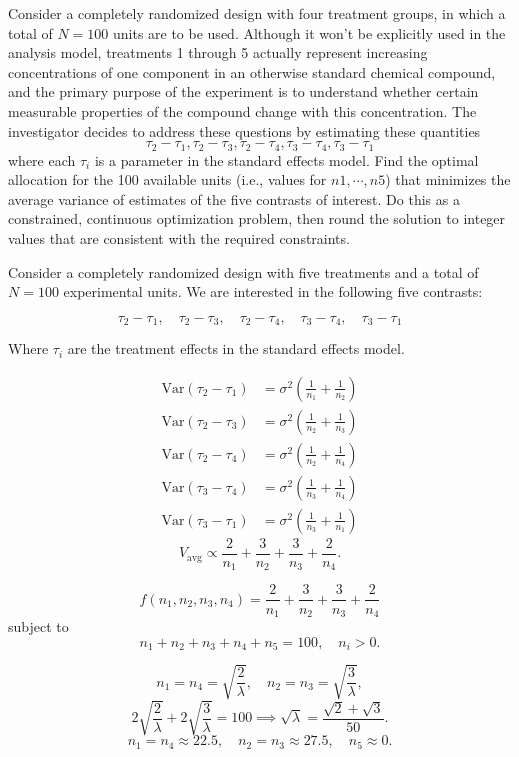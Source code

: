 \documentclass{article}
\begin{document}
Consider a completely randomized design with four treatment groups, in which a total of $N = 100$
units are to be used. Although it won’t be explicitly used in the analysis model, treatments 1 through
5 actually represent increasing concentrations of one component in an otherwise standard chemical
compound, and the primary purpose of the experiment is to understand whether certain measurable
properties of the compound change with this concentration. The investigator decides to address these
questions by estimating these quantities
$$
	\tau_2 -\tau_1, \tau_2-\tau_3, \tau_2-\tau_4,\tau_3 - \tau_4, \tau_3-\tau_1
$$
where each $\tau_i$ is a parameter in the standard effects model. Find the optimal allocation for the 100
available units (i.e., values for $n1,\cdots, n5$) that minimizes the average variance of estimates of the five
contrasts of interest. Do this as a constrained, continuous optimization problem, then round the solution
to integer values that are consistent with the required constraints.

Consider a completely randomized design with five treatments and a total of $N = 100$ experimental units. We are interested in the following five contrasts:

\[
	\tau_2 -\tau_1, \quad \tau_2-\tau_3, \quad \tau_2-\tau_4, \quad \tau_3 - \tau_4, \quad \tau_3-\tau_1
\]

Where $\tau_i$ are the treatment effects in the standard effects model.


\[
	\begin{aligned}
		\mathrm{Var}(\tau_2-\tau_1) & = \sigma^2 \left( \frac{1}{n_1} + \frac{1}{n_2} \right) \\
		\mathrm{Var}(\tau_2-\tau_3) & = \sigma^2 \left( \frac{1}{n_2} + \frac{1}{n_3} \right) \\
		\mathrm{Var}(\tau_2-\tau_4) & = \sigma^2 \left( \frac{1}{n_2} + \frac{1}{n_4} \right) \\
		\mathrm{Var}(\tau_3-\tau_4) & = \sigma^2 \left( \frac{1}{n_3} + \frac{1}{n_4} \right) \\
		\mathrm{Var}(\tau_3-\tau_1) & = \sigma^2 \left( \frac{1}{n_3} + \frac{1}{n_1} \right)
	\end{aligned}
\]
\[
	V_{\text{avg}} \propto \frac{2}{n_1} + \frac{3}{n_2} + \frac{3}{n_3} + \frac{2}{n_4}.
\]

\[
	f(n_1,n_2,n_3,n_4) = \frac{2}{n_1} + \frac{3}{n_2} + \frac{3}{n_3} + \frac{2}{n_4}
\]
subject to
\[
	n_1 + n_2 + n_3 + n_4 + n_5 = 100, \quad n_i > 0.
\]

\[
	n_1 = n_4 = \sqrt{\frac{2}{\lambda}}, \quad n_2 = n_3 = \sqrt{\frac{3}{\lambda}},
\]
\[
	2\sqrt{\frac{2}{\lambda}} + 2\sqrt{\frac{3}{\lambda}} = 100 \implies \sqrt{\lambda} = \frac{\sqrt{2}+\sqrt{3}}{50}.
\]
\[
	n_1 = n_4 \approx 22.5, \quad n_2 = n_3 \approx 27.5, \quad n_5 \approx 0.
\]
\end{document}
